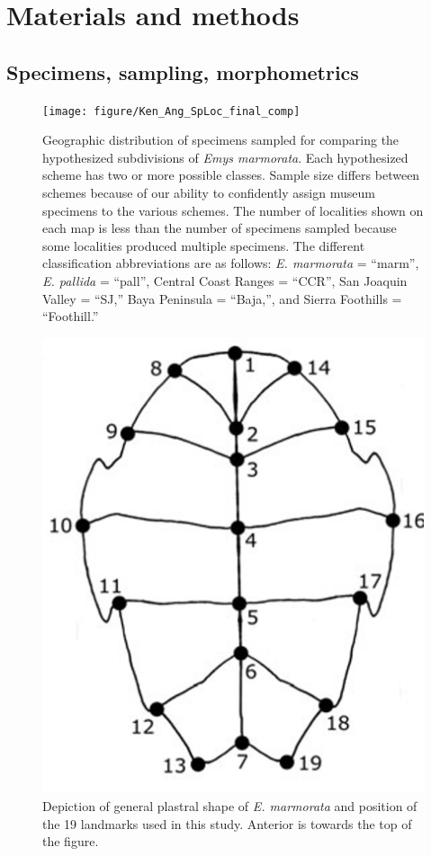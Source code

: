 \documentclass[10pt,letterpaper]{article}
\begin{document}
\section*{Materials and methods}
\subsection*{Specimens, sampling, morphometrics}

\afterpage{\clearpage}
\begin{figure}[ht]
  \centering
  \texttt{[image: figure/Ken\_Ang\_SpLoc\_final\_comp]}
  \caption{Geographic distribution of specimens sampled for comparing the hypothesized subdivisions of \textit{Emys marmorata}. Each hypothesized scheme has two or more possible classes. Sample size differs between schemes because of our ability to confidently assign museum specimens to the various schemes. The number of localities shown on each map is less than the number of specimens sampled because some localities produced multiple specimens. The different classification abbreviations are as follows: \textit{E. marmorata} = ``marm'', \textit{E. pallida} = ``pall'', Central Coast Ranges = ``CCR'', San Joaquin Valley = ``SJ,'' Baya Peninsula = ``Baja,'', and Sierra Foothills = ``Foothill.''}
  \label{fig:map}
\end{figure}

\afterpage{\clearpage}
\begin{figure}[ht]
  \centering
  \includegraphics[height = 0.5\textheight, width = \textwidth, keepaspectratio = true]{figure/plastra}
  \caption{Depiction of general plastral shape of \textit{E. marmorata} and position of the 19 landmarks used in this study. Anterior is towards the top of the figure.}
  \label{fig:plastra}
\end{figure}
\end{document}
